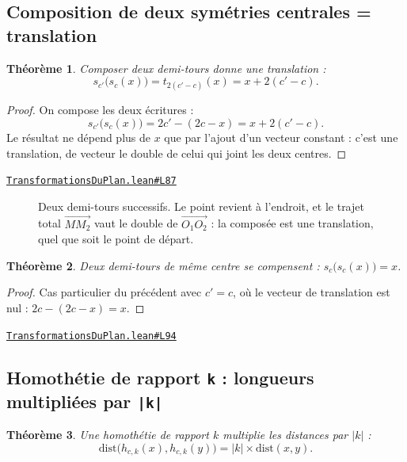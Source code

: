 \documentclass[11pt,a4paper]{article}
\theoremstyle{definition}
\theoremstyle{plain}
\newtheorem{theoreme}{Théorème}
\newcommand{\source}[2]{\par\smallskip\noindent\hfill{\footnotesize\href{#1}{\texttt{#2}}}\par\smallskip}
\begin{document}
\subsection{Composition de deux symétries centrales = translation}

\begin{theoreme}
Composer deux demi-tours donne une translation :
\[ s_{c'}\bigl(s_c(x)\bigr) = t_{2(c' - c)}(x) = x + 2(c' - c) . \]
\end{theoreme}

\begin{proof}
On compose les deux écritures :
\[ s_{c'}\bigl(s_c(x)\bigr) = 2c' - (2c - x) = x + 2(c' - c) . \]
Le résultat ne dépend plus de $x$ que par l'ajout d'un vecteur constant : c'est une
translation, de vecteur le double de celui qui joint les deux centres.
\end{proof}
\source{https://github.com/Commutator-IO/learn-lean/blob/main/courses/01-college/03-transformations-du-plan/TransformationsDuPlan.lean\#L87}{TransformationsDuPlan.lean\#L87}

\begin{figure}[h]
\centering

\caption{Deux demi-tours successifs. Le point revient à l'endroit, et le trajet total $\vec{MM_2}$ vaut le double de $\vec{O_1O_2}$ : la composée est une translation, quel que soit le point de départ.}
\end{figure}

\begin{theoreme}
Deux demi-tours de même centre se compensent : $s_c\bigl(s_c(x)\bigr) = x$.
\end{theoreme}

\begin{proof}
Cas particulier du précédent avec $c' = c$, où le vecteur de translation est nul :
$2c - (2c - x) = x$.
\end{proof}
\source{https://github.com/Commutator-IO/learn-lean/blob/main/courses/01-college/03-transformations-du-plan/TransformationsDuPlan.lean\#L94}{TransformationsDuPlan.lean\#L94}

\subsection{Homothétie de rapport \texttt{k} : longueurs multipliées par \texttt{|k|}}

\begin{theoreme}
Une homothétie de rapport $k$ multiplie les distances par $|k|$ :
\[ \mathrm{dist}\bigl(h_{c,k}(x), h_{c,k}(y)\bigr) = |k| \times \mathrm{dist}(x, y) . \]
\end{theoreme}
\end{document}
